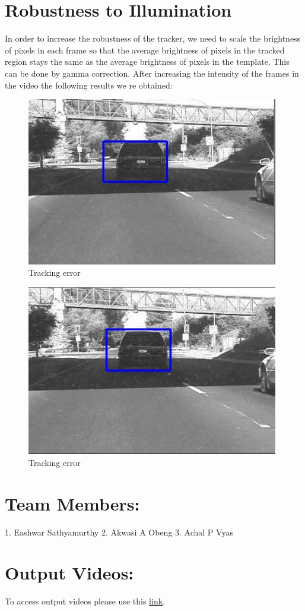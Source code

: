 \documentclass[12pt]{article}
\begin{document}
\section{Robustness to Illumination}
In order to increase the robustness of the tracker, we need to scale the brightness of pixels in each frame so that the average brightness of pixels in the tracked region stays the same as the average brightness of pixels in the template. This can be done by gamma correction.
After increasing the intensity of the frames in the video the following results we re obtained:
\begin{figure}[h]
    \centering
    \includegraphics[width=11cm]{trackcar4}
    \caption{Tracking error}
    \label{fig:Tracking error}
\end{figure}

\begin{figure}[h]
    \centering
    \includegraphics[width=11cm]{trackcar5}
    \caption{Tracking error}
    \label{fig:Tracking error}
\end{figure}

\section{Team Members:}
1. Eashwar Sathyamurthy
2. Akwasi A Obeng
3. Achal P Vyas
\section{Output Videos:}
To access output videos please use this \href{https://drive.google.com/drive/folders/1nbAUx-p-eyOWts9neJgAPA8YATY4ekmI?usp=sharing}{\underline{link}}.
\end{document}
